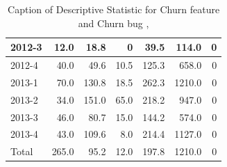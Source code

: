 \documentclass[UKenglish]{ifimaster}  %
\begin{document}
\begin{appendices}
\begin{table}[!htbp]
\begin{adjustwidth}{-1.5cm}{}
{{\begin{tabular}{ | l | r | r | r | r | r | r | }
2012-3 & 12.0 & 18.8 & 0 & 39.5 & 114.0 & 0\\ \hline
2012-4 & 40.0 & 49.6 & 10.5 & 125.3 & 658.0 & 0\\ \hline
2013-1 & 70.0 & 130.8 & 18.5 & 262.3 & 1210.0 & 0\\ \hline
2013-2 & 34.0 & 151.0 & 65.0 & 218.2 & 947.0 & 0\\ \hline
2013-3 & 46.0 & 80.7 & 15.0 & 144.2 & 574.0 & 0\\ \hline
2013-4 & 43.0 & 109.6 & 8.0 & 214.4 & 1127.0 & 0\\ \hline
Total & 265.0 & 95.2 & 12.0 & 197.8 & 1210.0 & 0\\ \hline
\end{tabular}
}
}
\end{adjustwidth}
\caption[Optional caption for list of figures]{Caption of Descriptive Statistic for Churn feature and Churn bug , }
\label{DS:6:4}
\end{table}




\end{appendices}
\end{document}
